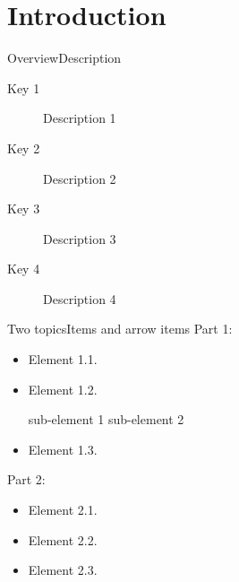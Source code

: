 \section{Introduction}

\begin{frame}{Overview}{Description}
    \begin{description}
        \item[Key 1] Description 1
        \vfill
        \item[Key 2] Description 2
        \vfill
        \item[Key 3] Description 3
        \vfill
        \item[Key 4] Description 4
    \end{description}
\end{frame}

\begin{frame}{Two topics}{Items and arrow items}
    Part 1:
    \begin{itemize}
        \item Element 1.1.
        \smallskip
        \item Element 1.2.
        \begin{itemize}
            \arrowitem sub-element 1
            \arrowitem sub-element 2
        \end{itemize}
        \smallskip
        \item Element 1.3.
    \end{itemize}

    \vfill
    Part 2:
    \begin{itemize}
        \item Element 2.1.
        \smallskip
        \item Element 2.2.
        \smallskip
        \item Element 2.3.
    \end{itemize}
\end{frame}
